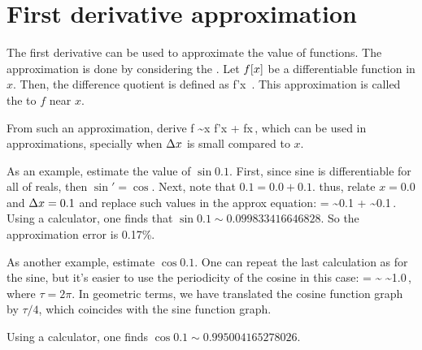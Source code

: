 \chapter*{First derivative approximation}
%
The first derivative can be used to approximate the value of functions. The approximation is done by considering the . Let $f\!\left[x\right]$ be a differentiable function in $x$. Then, the difference quotient is defined as
%
\beq
    f'\vat x  {}\,.
\eeq
%
This approximation is called the  to $f$ near $x$.

From such an approximation, derive
%
\beq
    f \sim \change x f'\vat x + f\vat x\,,
\eeq
%
which can be used in approximations, specially when $\Delta x$ is small compared to $x$.

As an example, estimate the value of $\sin 0.1$. First, since sine is differentiable for all of reals, then $\sin' = \cos$. Next, note that $0.1 = 0.0 + 0.1$. thus, relate $x = 0.0$ and $\Delta x = 0.1$ and replace such values in the approx equation:
%
\beq
    \sin{} = \sin{} 
                  \sim 0.1\cdot{} + 
                  \sim 0.1\,.
\eeq
%
Using a calculator, one finds that $\sin 0.1 \sim 0.099833416646828$. So the approximation error is 0.17\%.

As another example, estimate $\cos 0.1$. One can repeat the last calculation as for the sine, but it's easier to use the periodicity of the cosine in this case:
%
\beq
    \cos{} = \sin{}
                  \sim\sin{}
                  \sim 1.0\,,
\eeq
%
where $\tau = 2\pi$. In geometric terms, we have translated the cosine function graph by $\tau/4$, which coincides with the sine function graph.

Using a calculator, one finds $\cos 0.1 \sim 0.995004165278026$.
